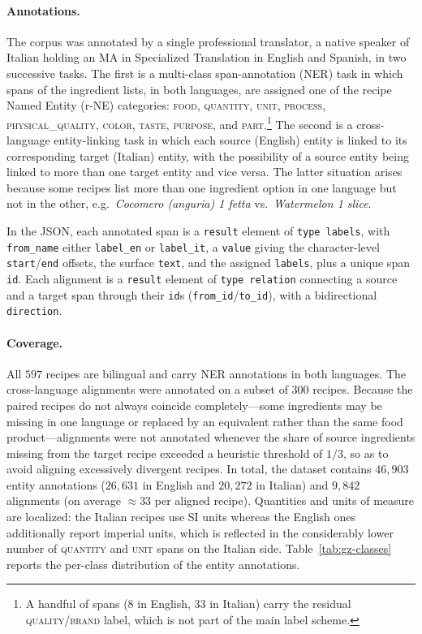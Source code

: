 \paragraph{Annotations.}
The corpus was annotated by a single professional translator, a native speaker
of Italian holding an MA in Specialized Translation in English and Spanish, in
two successive tasks. The first is a multi-class span-annotation (NER) task in
which spans of the ingredient lists, in both languages, are assigned one of the
recipe Named Entity (r-NE) categories: \textsc{food}, \textsc{quantity},
\textsc{unit}, \textsc{process}, \textsc{physical\_quality}, \textsc{color},
\textsc{taste}, \textsc{purpose}, and \textsc{part}.\footnote{A handful of spans
($8$ in English, $33$ in Italian) carry the residual \textsc{quality/brand}
label, which is not part of the main label scheme.} The second is a
cross-language entity-linking task in which each source (English) entity is
linked to its corresponding target (Italian) entity, with the possibility of a
source entity being linked to more than one target entity and vice versa. The
latter situation arises because some recipes list more than one ingredient
option in one language but not in the other, e.g.\ \emph{Cocomero (anguria) 1
fetta} vs.\ \emph{Watermelon 1 slice}.

In the JSON, each annotated span is a \texttt{result} element of
\texttt{type}~\texttt{labels}, with \texttt{from\_name} either \texttt{label\_en}
or \texttt{label\_it}, a \texttt{value} giving the character-level
\texttt{start}/\texttt{end} offsets, the surface \texttt{text}, and the assigned
\texttt{labels}, plus a unique span \texttt{id}. Each alignment is a
\texttt{result} element of \texttt{type}~\texttt{relation} connecting a source
and a target span through their \texttt{id}s (\texttt{from\_id}/\texttt{to\_id}),
with a bidirectional \texttt{direction}.

\paragraph{Coverage.}
All $597$ recipes are bilingual and carry NER annotations in both languages.
The cross-language alignments were annotated on a subset of $300$ recipes.
Because the paired recipes do not always coincide completely---some ingredients
may be missing in one language or replaced by an equivalent rather than the same
food product---alignments were not annotated whenever the share of source
ingredients missing from the target recipe exceeded a heuristic threshold of
$1/3$, so as to avoid aligning excessively divergent recipes. In total, the
dataset contains $46{,}903$ entity annotations ($26{,}631$ in English and
$20{,}272$ in Italian) and $9{,}842$ alignments (on average $\approx 33$ per
aligned recipe). Quantities and units of measure are localized: the Italian
recipes use SI units whereas the English ones additionally report imperial
units, which is reflected in the considerably lower number of
\textsc{quantity} and \textsc{unit} spans on the Italian side.
Table~\ref{tab:gz-classes} reports the per-class distribution of the entity
annotations.

